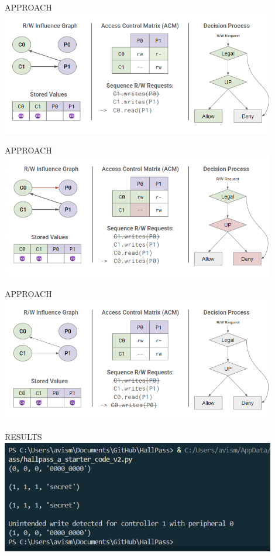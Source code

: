 \begin{frame}{APPROACH}
    \centering
    \includegraphics[height=0.9\textheight,width=0.9\textwidth,keepaspectratio]{slide 3.png}
\end{frame}

\begin{frame}{APPROACH}
    \centering
    \includegraphics[height=0.9\textheight,width=0.9\textwidth,keepaspectratio]{slide 4.png}
\end{frame}

\begin{frame}{APPROACH}
    \centering
    \includegraphics[height=0.9\textheight,width=0.9\textwidth,keepaspectratio]{slide 5.png}
\end{frame}

\begin{frame}{RESULTS}
    \centering
    \includegraphics[height=0.9\textheight,width=0.9\textwidth,keepaspectratio]{coderesults.png}
\end{frame}

